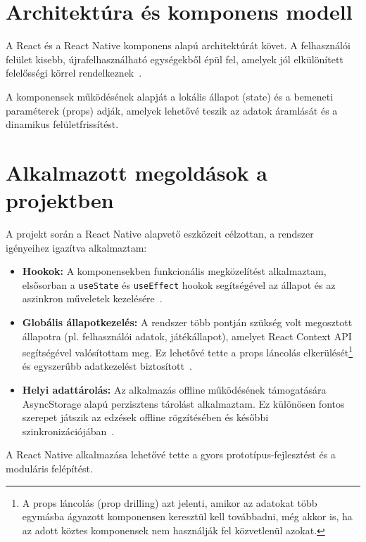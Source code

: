 \documentclass[
]{thesis-ekf}
\theoremstyle{definition}
\theoremstyle{remark}
\begin{document}
\section{Architektúra és komponens modell}

A React és a React Native komponens alapú architektúrát követ. A felhasználói felület kisebb, újrafelhasználható egységekből épül fel, amelyek jól elkülönített felelősségi körrel rendelkeznek~\cite{react_components}.

A komponensek működésének alapját a lokális állapot (state) és a bemeneti paraméterek (props) adják, amelyek lehetővé teszik az adatok áramlását és a dinamikus felületfrissítést.

\section{Alkalmazott megoldások a projektben}

A projekt során a React Native alapvető eszközeit célzottan, a rendszer igényeihez igazítva alkalmaztam:

\begin{itemize}
    \item \textbf{Hookok:} A komponensekben funkcionális megközelítést alkalmaztam, elsősorban a \texttt{useState} és \texttt{useEffect} hookok segítségével az állapot és az aszinkron műveletek kezelésére~\cite{react_hooks}.
    
    \item \textbf{Globális állapotkezelés:} A rendszer több pontján szükség volt megosztott állapotra (pl. felhasználói adatok, játékállapot), amelyet React Context API segítségével valósítottam meg. Ez lehetővé tette a props láncolás elkerülését\footnote{A props láncolás (prop drilling) azt jelenti, amikor az adatokat több egymásba ágyazott komponensen keresztül kell továbbadni, még akkor is, ha az adott köztes komponensek nem használják fel közvetlenül azokat.} és egyszerűbb adatkezelést biztosított~\cite{react_context}.
    
    \item \textbf{Helyi adattárolás:} Az alkalmazás offline működésének támogatására AsyncStorage alapú perzisztens tárolást alkalmaztam. Ez különösen fontos szerepet játszik az edzések offline rögzítésében és későbbi szinkronizációjában~\cite{async_storage}.
\end{itemize}

A React Native alkalmazása lehetővé tette a gyors prototípus-fejlesztést és a moduláris felépítést.
\end{document}
